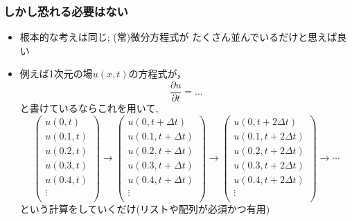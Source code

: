 \documentclass[12pt,dvipdfmx]{beamer}
\newcommand{\ao}[1]{{\color{blue}#1}}
\begin{document}
\begin{frame}
\frametitle{しかし恐れる必要はない}
\begin{itemize}
\item 根本的な考えは同じ; (常)微分方程式が
\ao{たくさん並んでいるだけ}と思えば良い
\item 例えば1次元の場$u(x, t)$の方程式が，
\[ \frac{\partial u}{\partial t} = \ldots \]
と書けているならこれを用いて, 
{\footnotesize
\[
\left(
\begin{array}{c}
u(0,   t) \\
u(0.1,t) \\
u(0.2,t) \\
u(0.3,t) \\
u(0.4,t) \\
  \vdots  \\
\end{array}
\right)
\rightarrow
\left(
\begin{array}{c}
u(0,   t+\Delta t) \\
u(0.1,t+\Delta t) \\
u(0.2,t+\Delta t) \\
u(0.3,t+\Delta t) \\
u(0.4,t+\Delta t) \\
  \vdots  \\
\end{array}
\right)
\rightarrow
\left(
\begin{array}{c}
u(0,   t+2\Delta t) \\
u(0.1,t+2\Delta t) \\
u(0.2,t+2\Delta t) \\
u(0.3,t+2\Delta t) \\
u(0.4,t+2\Delta t) \\
  \vdots  \\
\end{array}
\right)
\rightarrow \cdots
\]}
という計算をしていくだけ(リストや配列が必須かつ有用)
\end{itemize}
\end{frame}
\end{document}
